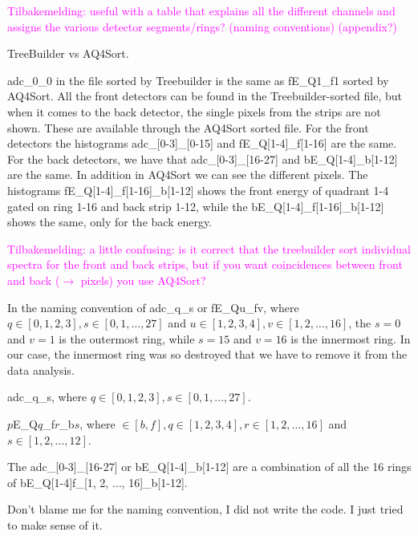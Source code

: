 \documentclass[twoside,english]{uiofysmaster/uiofysmaster}
\begin{document}
\textcolor{Magenta}{Tilbakemelding: \newline 
useful with a table that explains all the different channels and assigns the various detector segments/rings? (naming conventions) (appendix?)
}

\begin{table}[ht] 
	\centering 
	\caption{TreeBuilder vs AQ4Sort.}
	
	\label{tab:TBvsAQ4}
\end{table}

adc\_0\_0 in the file sorted by Treebuilder is the same as fE\_Q1\_f1 sorted by AQ4Sort. All the front detectors can be found in the Treebuilder-sorted file, but when it comes to the back detector, the single pixels from the strips are not shown. These are available through the AQ4Sort sorted file. For the front detectors the histograms adc\_[0-3]\_[0-15] and fE\_Q[1-4]\_f[1-16] are the same. For the back detectors, we have that adc\_[0-3]\_[16-27] and bE\_Q[1-4]\_b[1-12] are the same. In addition in AQ4Sort we can see the different pixels. The histograms fE\_Q[1-4]\_f[1-16]\_b[1-12] shows the front energy of quadrant 1-4 gated on ring 1-16 and back strip 1-12, while the bE\_Q[1-4]\_f[1-16]\_b[1-12] shows the same, only for the back energy. 

\textcolor{Magenta}{Tilbakemelding: \newline 
a little confusing: is it correct that the treebuilder sort individual spectra for the front and back strips, but if you want coincidences between front and back ($\rightarrow$ pixels) you use AQ4Sort?
}

In the naming convention of adc\_q\_s or fE\_Qu\_fv, where $q \in [0, 1, 2, 3], s \in [0, 1, \ldots, 27]$ and $u \in [1, 2, 3, 4], v \in [1, 2, \ldots, 16]$, the $s = 0$ and $v = 1$ is the outermost ring, while $s = 15$ and $v = 16$ is the innermost ring. In our case, the innermost ring was so destroyed that we have to remove it from the data analysis.


adc\_q\_s, where $q \in [0, 1, 2, 3], s \in [0, 1, \ldots, 27]$.

$p$E\_Q$q$\_f$r$\_b$s$, where $ \in [b, f], q \in [1, 2, 3, 4], r \in [1, 2, \ldots, 16]$ and $s \in [1, 2, \ldots, 12]$. 

The adc\_[0-3]\_[16-27] or bE\_Q[1-4]\_b[1-12] are a combination of all the 16 rings of bE\_Q[1-4]f\_[1, 2, $\ldots$, 16]\_b[1-12].

Don't blame me for the naming convention, I did not write the code. I just tried to make sense of it.
\end{document}
